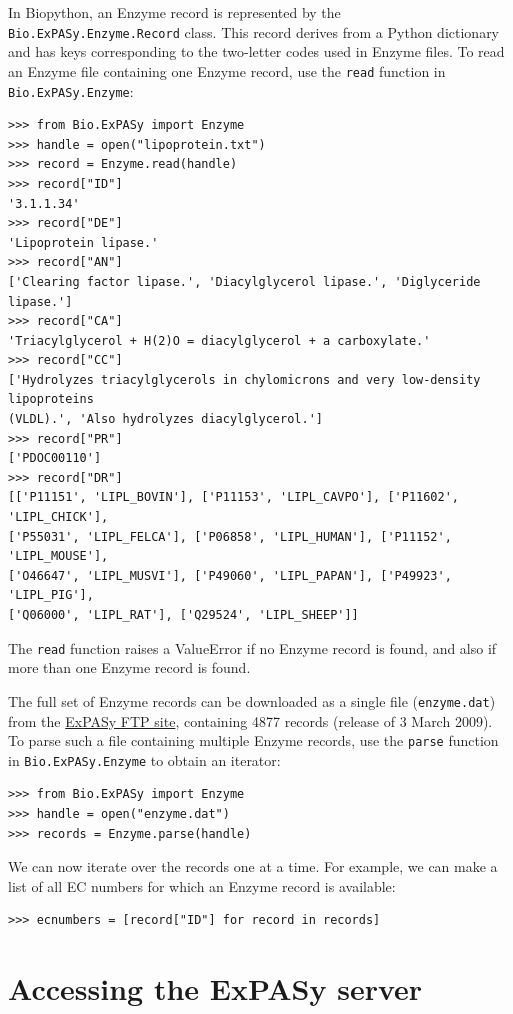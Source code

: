 \documentclass{report}
\begin{document}
In Biopython, an Enzyme record is represented by the \verb|Bio.ExPASy.Enzyme.Record| class. This record derives from a Python dictionary and has keys corresponding to the two-letter codes used in Enzyme files. To read an Enzyme file containing one Enzyme record, use the \verb+read+ function in \verb|Bio.ExPASy.Enzyme|:

\begin{verbatim}
>>> from Bio.ExPASy import Enzyme
>>> handle = open("lipoprotein.txt")
>>> record = Enzyme.read(handle)
>>> record["ID"]
'3.1.1.34'
>>> record["DE"]
'Lipoprotein lipase.'
>>> record["AN"]
['Clearing factor lipase.', 'Diacylglycerol lipase.', 'Diglyceride lipase.']
>>> record["CA"]
'Triacylglycerol + H(2)O = diacylglycerol + a carboxylate.'
>>> record["CC"]
['Hydrolyzes triacylglycerols in chylomicrons and very low-density lipoproteins
(VLDL).', 'Also hydrolyzes diacylglycerol.']
>>> record["PR"]
['PDOC00110']
>>> record["DR"]
[['P11151', 'LIPL_BOVIN'], ['P11153', 'LIPL_CAVPO'], ['P11602', 'LIPL_CHICK'],
['P55031', 'LIPL_FELCA'], ['P06858', 'LIPL_HUMAN'], ['P11152', 'LIPL_MOUSE'],
['O46647', 'LIPL_MUSVI'], ['P49060', 'LIPL_PAPAN'], ['P49923', 'LIPL_PIG'],
['Q06000', 'LIPL_RAT'], ['Q29524', 'LIPL_SHEEP']]
\end{verbatim}
The \verb+read+ function raises a ValueError if no Enzyme record is found, and also if more than one Enzyme record is found.

The full set of Enzyme records can be downloaded as a single file (\verb|enzyme.dat|) from the \href{ftp://ftp.expasy.org/databases/enzyme/enzyme.dat}{ExPASy FTP site}, containing 4877 records (release of 3 March 2009). To parse such a file containing multiple Enzyme records, use the \verb+parse+ function in \verb+Bio.ExPASy.Enzyme+ to obtain an iterator:

\begin{verbatim}
>>> from Bio.ExPASy import Enzyme
>>> handle = open("enzyme.dat")
>>> records = Enzyme.parse(handle)
\end{verbatim}

We can now iterate over the records one at a time. For example, we can make a list of all EC numbers for which an Enzyme record is available:
\begin{verbatim}
>>> ecnumbers = [record["ID"] for record in records]
\end{verbatim}

\section{Accessing the ExPASy server}
\end{document}
